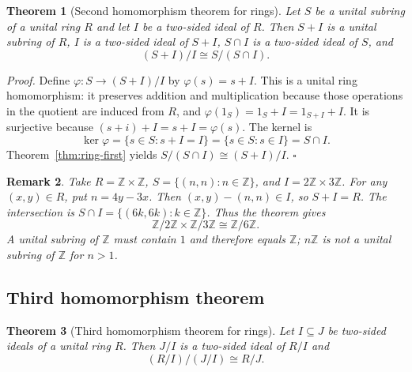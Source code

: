 \documentclass[11pt,letterpaper]{article}
\newcommand{\Z}{\mathbb{Z}}
\newcommand{\Map}[3]{#1 \colon #2 \to #3}
\newtheorem{theorem}{Theorem}
\newtheorem{remark}[theorem]{Remark}
\newenvironment{proof}{\noindent\textit{Proof.}}{\hfill\(\square\)}
\begin{document}
\begin{theorem}[Second homomorphism theorem for rings]
\label{thm:ring-second}
Let \(S\) be a unital subring of a unital ring \(R\) and let \(I\) be a two-sided ideal of \(R\). Then \(S+I\) is a unital subring of \(R\), \(I\) is a two-sided ideal of \(S+I\), \(S\cap I\) is a two-sided ideal of \(S\), and
\[
(S+I)/I \cong S/(S\cap I).
\]
\end{theorem}

\begin{proof}
Define \(\Map{\varphi}{S}{(S+I)/I}\) by \(\varphi(s)=s+I\). This is a unital ring homomorphism: it preserves addition and multiplication because those operations in the quotient are induced from \(R\), and \(\varphi(1_S)=1_S+I=1_{S+I}+I\). It is surjective because \((s+i)+I=s+I=\varphi(s)\). The kernel is
\[
\ker\varphi=\{s\in S:s+I=I\}=\{s\in S:s\in I\}=S\cap I.
\]
Theorem~\ref{thm:ring-first} yields \(S/(S\cap I)\cong(S+I)/I\).
\end{proof}

\begin{center}
\end{center}

\begin{remark}
Take \(R=\Z\times\Z\), \(S=\{(n,n):n\in\Z\}\), and \(I=2\Z\times3\Z\). For any \((x,y)\in R\), put \(n=4y-3x\). Then \((x,y)-(n,n)\in I\), so \(S+I=R\). The intersection is \(S\cap I=\{(6k,6k):k\in\Z\}\). Thus the theorem gives
\[
\Z/2\Z\times\Z/3\Z\cong\Z/6\Z.
\]
A unital subring of \(\Z\) must contain \(1\) and therefore equals \(\Z\); \(n\Z\) is not a unital subring of \(\Z\) for \(n>1\).
\end{remark}

\subsection{Third homomorphism theorem}

\begin{theorem}[Third homomorphism theorem for rings]
\label{thm:ring-third}
Let \(I\subseteq J\) be two-sided ideals of a unital ring \(R\). Then \(J/I\) is a two-sided ideal of \(R/I\) and
\[
(R/I)/(J/I) \cong R/J.
\]
\end{theorem}
\end{document}
